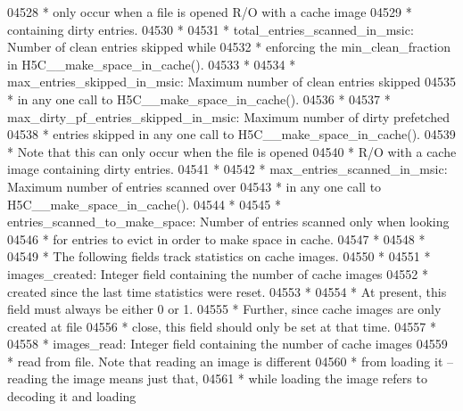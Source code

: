 \begin{DoxyCode}
04528 \textcolor{comment}{ *              only occur when a file is opened R/O with a cache image}
04529 \textcolor{comment}{ *              containing dirty entries.}
04530 \textcolor{comment}{ *}
04531 \textcolor{comment}{ * total\_entries\_scanned\_in\_msic: Number of clean entries skipped while}
04532 \textcolor{comment}{ *              enforcing the min\_clean\_fraction in H5C\_\_make\_space\_in\_cache().}
04533 \textcolor{comment}{ *}
04534 \textcolor{comment}{ * max\_entries\_skipped\_in\_msic: Maximum number of clean entries skipped}
04535 \textcolor{comment}{ *              in any one call to H5C\_\_make\_space\_in\_cache().}
04536 \textcolor{comment}{ *}
04537 \textcolor{comment}{ * max\_dirty\_pf\_entries\_skipped\_in\_msic: Maximum number of dirty prefetched}
04538 \textcolor{comment}{ *              entries skipped in any one call to H5C\_\_make\_space\_in\_cache().}
04539 \textcolor{comment}{ *              Note that this can only occur when the file is opened }
04540 \textcolor{comment}{ *              R/O with a cache image containing dirty entries.}
04541 \textcolor{comment}{ *}
04542 \textcolor{comment}{ * max\_entries\_scanned\_in\_msic: Maximum number of entries scanned over}
04543 \textcolor{comment}{ *              in any one call to H5C\_\_make\_space\_in\_cache().}
04544 \textcolor{comment}{ *}
04545 \textcolor{comment}{ * entries\_scanned\_to\_make\_space: Number of entries scanned only when looking}
04546 \textcolor{comment}{ *              for entries to evict in order to make space in cache.}
04547 \textcolor{comment}{ *}
04548 \textcolor{comment}{ *}
04549 \textcolor{comment}{ * The following fields track statistics on cache images.  }
04550 \textcolor{comment}{ *}
04551 \textcolor{comment}{ * images\_created:  Integer field containing the number of cache images}
04552 \textcolor{comment}{ *      created since the last time statistics were reset.  }
04553 \textcolor{comment}{ *}
04554 \textcolor{comment}{ *      At present, this field must always be either 0 or 1.}
04555 \textcolor{comment}{ *      Further, since cache images are only created at file }
04556 \textcolor{comment}{ *      close, this field should only be set at that time.}
04557 \textcolor{comment}{ *}
04558 \textcolor{comment}{ * images\_read: Integer field containing the number of cache images }
04559 \textcolor{comment}{ *              read from file.  Note that reading an image is different}
04560 \textcolor{comment}{ *              from loading it -- reading the image means just that,}
04561 \textcolor{comment}{ *              while loading the image refers to decoding it and loading}

\end{DoxyCode}
